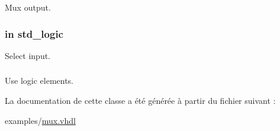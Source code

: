 Mux output. 

\hypertarget{classmux__using__with_a00d652a26316e86f236042f42bcc035d}{}
\subsubsection[{sel}]{ {\bfseries \textcolor{vhdlchar}{in}\textcolor{vhdlchar}{ }} {\bfseries \textcolor{vhdlchar}{std\+\_\+logic}\textcolor{vhdlchar}{ }} \hspace{0.3cm}{\ttfamily [Port]}}\label{classmux__using__with_a00d652a26316e86f236042f42bcc035d}


Select input. 

\hypertarget{classmux__using__with_ae984d6918908b859c4f9c9a950a0cfee}{}
\subsubsection[{std\+\_\+logic\+\_\+1164}]{\hspace{0.3cm}{\ttfamily [Package]}}\label{classmux__using__with_ae984d6918908b859c4f9c9a950a0cfee}


Use logic elements. 



La documentation de cette classe a été générée à partir du fichier suivant \+:\begin{DoxyCompactItemize}
\item 
examples/\hyperlink{mux_8vhdl}{mux.\+vhdl}\end{DoxyCompactItemize}
